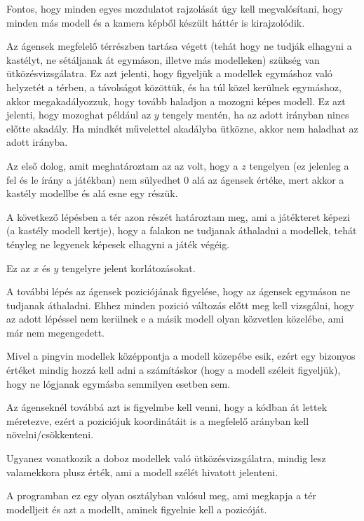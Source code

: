 
Fontos, hogy minden egyes mozdulatot rajzolását úgy kell megvalósítani, hogy minden más modell és a kamera képből készült háttér is kirajzolódik.
 

Az ágensek megfelelő térrészben tartása végett (tehát hogy ne tudják elhagyni a kastélyt, ne sétáljanak át egymáson, illetve más modelleken) szükség van ütközésvizsgálatra.
Ez azt jelenti, hogy figyeljük a modellek egymáshoz való helyzetét a térben, a távolságot közöttük, és ha túl közel kerülnek egymáshoz, akkor megakadályozzuk, hogy tovább haladjon a mozogni képes modell.
Ez azt jelenti, hogy  mozoghat  például az $y$ tengely mentén, ha az adott irányban nincs előtte akadály.
Ha mindkét művelettel akadályba ütközne, akkor nem haladhat az adott irányba.
 
Az első dolog, amit meghatároztam az az volt, hogy a $z$ tengelyen (ez jelenleg a fel és le írány a játékban) nem sülyedhet 0 alá az ágensek értéke, mert akkor a kastély modellbe és alá esne egy részük.

A következő lépésben a tér azon részét határoztam meg, ami a játékteret képezi (a kastély modell kertje), hogy a falakon ne tudjanak áthaladni a modellek, tehát tényleg ne legyenek képesek elhagyni a játék végéig.

Ez az $x$ és $y$ tengelyre jelent korlátozásokat.

A további lépés az ágensek poziciójának figyelése, hogy az ágensek egymáson ne tudjanak áthaladni. Ehhez minden pozició változás előtt meg kell vizsgálni, hogy az adott lépéssel nem kerülnek e a másik modell olyan közvetlen közelébe, ami már nem megengedett.

Mivel a pingvin modellek középpontja a modell közepébe esik, ezért egy bizonyos értéket mindig hozzá kell adni a számításkor (hogy a modell széleit figyeljük), hogy ne lógjanak egymásba semmilyen esetben sem. 

Az ágenseknél továbbá azt is figyelmbe kell venni, hogy a kódban át lettek méretezve, ezért a poziciójuk koordinátáit is a megfelelő arányban kell növelni/csökkenteni.

Ugyanez vonatkozik a doboz modellek való ütközésvizsgálatra, mindig lesz valamekkora plusz érték, ami a modell szélét hivatott jelenteni.

A programban ez egy olyan osztályban valósul meg, ami megkapja a tér modelljeit és azt a modellt, aminek figyelnie kell a pozicóját.
 
